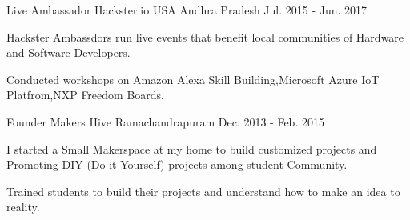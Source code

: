 \begin{cventries}
{\begin{cvitems}
      \end{cvitems} 
    }
  \cventry
    {Live Ambassador}
    {Hackster.io USA}
    {Andhra Pradesh}
    {Jul. 2015 - Jun. 2017}
    {
      \begin{cvitems}
        \item {Hackster Ambassdors run live events that benefit local communities of Hardware and Software Developers.}
	\item{Conducted workshops on Amazon Alexa Skill Building,Microsoft Azure IoT Platfrom,NXP Freedom Boards.}
      \end{cvitems}
    }
  \cventry
    {Founder}
    {Makers Hive}
    {Ramachandrapuram}
    {Dec. 2013 - Feb. 2015}
    {
      \begin{cvitems}
        \item {I started a Small Makerspace at my home to build customized projects and Promoting DIY (Do it Yourself) projects among student Community. }
	\item{Trained students to build their projects and understand how to make an idea to reality.}
      \end{cvitems}
    }
\end{cventries}
